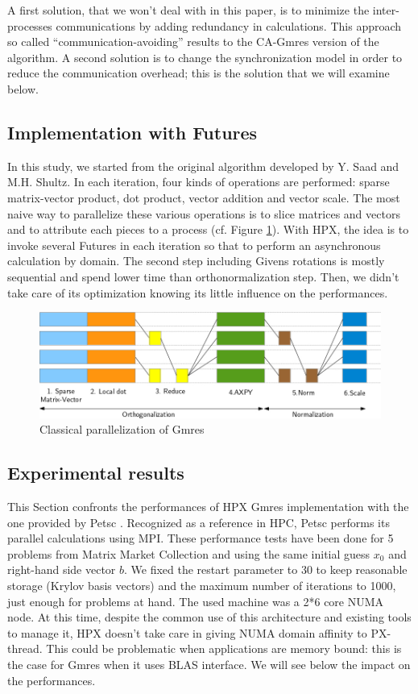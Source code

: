 \documentclass[smallextended]{svjour3}
\begin{document}
A first solution, that we won't deal with in this paper, is to minimize the inter-processes communications by adding redundancy in calculations. This approach so called \enquote{communication-avoiding} \cite{CAGMRES} results to the CA-Gmres version of the algorithm. A second solution is to change the synchronization model in order to reduce the communication overhead; this is the solution that we will examine below.

\subsection{Implementation with Futures}
In this study, we started from the original algorithm \cite{GMRES} developed by Y. Saad and M.H. Shultz. In each iteration, four kinds of operations are performed: sparse matrix-vector product, dot product, vector addition and vector scale. The most naive way to parallelize these various operations is to slice matrices and vectors and to attribute each pieces to a process (cf. Figure \ref{pargmres}). With HPX, the idea is to invoke several Futures in each iteration so that to perform an asynchronous calculation by domain. The second step including Givens rotations is mostly sequential and spend lower time than orthonormalization step. Then, we didn't take care of its optimization knowing its little influence on the performances.

\begin{figure}[h]
\begin{center}
\includegraphics[scale=0.5]{Images/Im6.jpeg}
\end{center}
\caption{Classical parallelization of Gmres}
\label{pargmres}
\end{figure}

\subsection{Experimental results}
This Section confronts the performances of HPX Gmres implementation with the one provided by Petsc \cite{Petsc}. Recognized as a reference in HPC, Petsc performs its parallel calculations using MPI. These performance tests have been done for 5 problems from Matrix Market Collection and using the same initial guess $x_{0}$ and right-hand side vector $b$. We fixed the restart parameter to 30 to keep reasonable storage (Krylov basis vectors) and the maximum number of iterations to 1000, just enough for problems at hand. The used machine was a 2*6 core NUMA node. At this time, despite the common use of this architecture and existing tools to manage it, HPX doesn't take care in giving NUMA domain affinity to PX-thread. This could be problematic when applications are memory bound: this is the case for Gmres when it uses BLAS interface. We will see below the impact on the performances.\smallskip  
\end{document}
